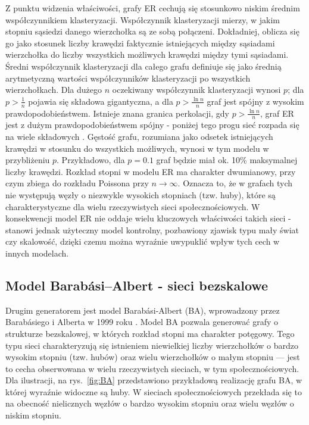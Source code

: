 Z punktu widzenia właściwości, grafy ER cechują się stosunkowo niskim średnim współczynnikiem klasteryzacji.
Współczynnik klasteryzacji mierzy, w jakim stopniu sąsiedzi danego wierzchołka są ze sobą połączeni.
Dokładniej, oblicza się go jako stosunek liczby krawędzi faktycznie istniejących między sąsiadami wierzchołka do liczby wszystkich możliwych krawędzi między tymi sąsiadami.
Średni współczynnik klasteryzacji dla całego grafu definiuje się jako średnią arytmetyczną wartości współczynników klasteryzacji po wszystkich wierzchołkach.
Dla dużego $n$ oczekiwany współczynnik klasteryzacji wynosi $p$; dla $p>\tfrac{1}{n}$ pojawia się składowa gigantyczna, a dla $p>\tfrac{\ln n}{n}$ graf jest spójny z wysokim prawdopodobieństwem.
Istnieje znana granica perkolacji, gdy $p>\frac{\ln n}{n}$, graf ER jest z dużym prawdopodobieństwem spójny - poniżej tego progu sieć rozpada się na wiele składowych \cite{ErdosRenyi1960}. Gęstość grafu, rozumiana jako odsetek istniejących krawędzi w stosunku do wszystkich możliwych, wynosi w tym modelu w przybliżeniu $p$. Przykładowo, dla $p=0.1$ graf będzie miał ok. 10\% maksymalnej liczby krawędzi. Rozkład stopni w modelu ER ma charakter dwumianowy, przy czym zbiega do rozkładu Poissona przy $n\to\infty$. Oznacza to, że w grafach tych nie występują węzły o niezwykle wysokich stopniach (tzw. huby), które są charakterystyczne dla wielu rzeczywistych sieci społecznościowych. W konsekwencji model ER nie oddaje wielu kluczowych właściwości takich sieci - stanowi jednak użyteczny model kontrolny, pozbawiony zjawisk typu mały świat czy skalowość, dzięki czemu można wyraźnie uwypuklić wpływ tych cech w innych modelach.


\subsection{Model Barabási--Albert - sieci bezskalowe}
Drugim generatorem jest model Barabási-Albert (BA), wprowadzony przez Barabásiego i Alberta w 1999 roku \cite{barabasi1999emergence}. Model BA pozwala generować grafy o strukturze bezskalowej, w których rozkład stopni ma charakter potęgowy. Tego typu sieci charakteryzują się istnieniem niewielkiej liczby wierzchołków o bardzo wysokim stopniu (tzw. hubów) oraz wielu wierzchołków o małym stopniu — jest to cecha obserwowana w wielu rzeczywistych sieciach, w tym społecznościowych. Dla ilustracji, na rys.~\ref{fig:BA} przedstawiono przykładową realizację grafu BA, w której wyraźnie widoczne są huby. W sieciach społecznościowych przekłada się to na obecność nielicznych węzłów o bardzo wysokim stopniu oraz wielu węzłów o niskim stopniu.

